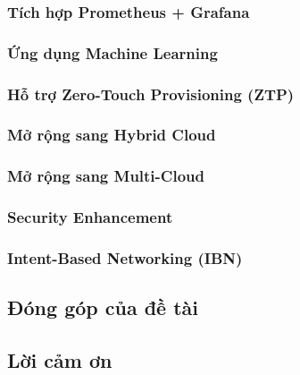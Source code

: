 \subsubsection{Tích hợp Prometheus + Grafana}

\subsubsection{Ứng dụng Machine Learning}

\subsubsection{Hỗ trợ Zero-Touch Provisioning (ZTP)}

\subsubsection{Mở rộng sang Hybrid Cloud}

\subsubsection{Mở rộng sang Multi-Cloud}

\subsubsection{Security Enhancement}

\subsubsection{Intent-Based Networking (IBN)}

\subsection{Đóng góp của đề tài}

\subsection{Lời cảm ơn}
